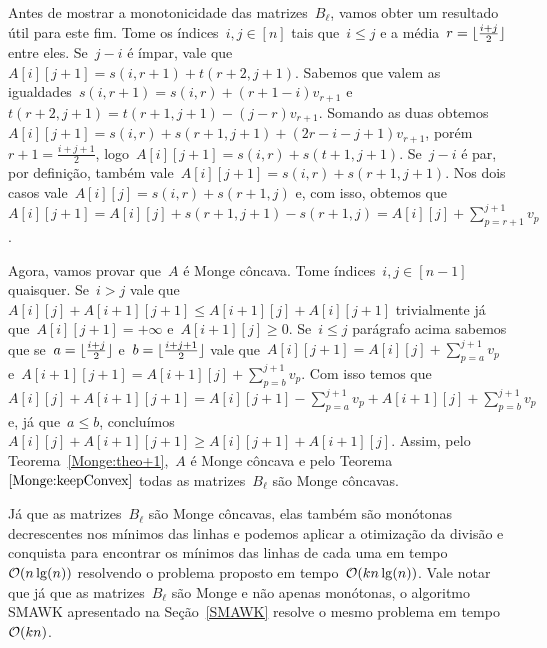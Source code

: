 Antes de mostrar a monotonicidade das matrizes~$B_\ell$, vamos obter um resultado útil para este fim. Tome os índices~${ i,j \in [n] }$ tais que~${ i \leq j }$ e a média~${ r = \lfloor\frac{i+j}{2}\rfloor }$ entre eles. Se~${j-i}$ é ímpar, vale que~${ A[i][j+1] = s(i,r+1) + t(r+2,j+1) }$. Sabemos que valem as igualdades~${ s(i,r+1) = s(i,r) + (r+1-i)v_{r+1} }$ e~${ t(r +2,j+1) = t(r+1,j+1) - (j-r)v_{r+1} }$. Somando as duas obtemos~${ A[i][j+1] = s(i,r) + s(r+1,j+1) + (2r-i-j+1)v_{r+1} }$, porém~${ r + 1 = \frac{i+j+1}{2} }$, logo~${ A[i][j+1] = s(i,r) + s(t+1,j+1) }$. Se~${ j -i }$ é par, por definição, também vale~${ A[i][j+1] = s(i,r) + s(r+1,j+1) }$. Nos dois casos vale~${ A[i][j] = s(i,r) + s(r+1,j) }$ e, com isso, obtemos que~${ A[i][j+1] = A[i][j] + s(r+1,j+1) - s(r+1,j) = A[i][j] + \sum\limits_{p=r+1}^{j+1} v_p }$.

Agora, vamos provar que~$A$ é Monge côncava. Tome índices~${ i,j \in [n-1] }$ quaisquer. Se~${ i > j }$ vale que~${A[i][j] + A[i+1][j+1] \leq A[i+1][j] + A[i][j+1]}$ trivialmente já que~${ A[i][j+1] = +\infty }$ e~${A[i+1][j] \geq 0}$. Se~${ i \leq j }$ parágrafo acima sabemos que se~${ a = \lfloor\frac{i+j}{2}\rfloor }$ e~${ b = \lfloor\frac{i+j+1}{2}\rfloor }$ vale que~${ A[i][j+1] = A[i][j] + \sum\limits_{p=a}^{j+1} v_p }$ e~${A[i+1][j+1] = A[i+1][j] + \sum\limits_{p=b}^{j+1} v_p }$. Com isso temos que~${ A[i][j] + A[i+1][j+1] = A[i][j+1] - \sum\limits_{p=a}^{j+1} v_p + A[i+1][j] + \sum\limits_{p=b}^{j+1} v_p }$ e, já que~$a \leq b$, concluímos~${ A[i][j] + A[i+1][j+1] \geq A[i][j+1] + A[i+1][j] }$. Assim, pelo Teorema~\ref{Monge:theo+1},~$A$ é Monge côncava e pelo Teorema~$\ref{Monge:keepConvex}$ todas as matrizes~$B_\ell$ são Monge côncavas.

Já que as matrizes~$B_\ell$ são Monge côncavas, elas também são monótonas decrescentes nos mínimos das linhas e podemos aplicar a otimização da divisão e conquista para encontrar os mínimos das linhas de cada uma em tempo~$\mathcal{O}(n\lg(n))$ resolvendo o problema proposto em tempo~$\mathcal{O}(kn\lg(n))$. Vale notar que já que as matrizes~$B_\ell$ são Monge e não apenas monótonas, o algoritmo SMAWK apresentado na Seção~\ref{SMAWK} resolve o mesmo problema em tempo~$\mathcal{O}(kn)$.
